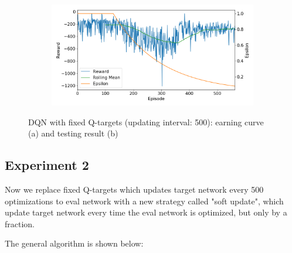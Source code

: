 \documentclass[10pt]{article}
\begin{document}
\begin{figure}[H]
\begin{subfigure}[b]{0.49\linewidth}
      \caption{}
  \label{fig:train_param_0082}
  \end{subfigure}
  \begin{subfigure}[b]{0.49\linewidth}
  \centering
  \includegraphics[width=\linewidth]{../logs/train_param_0083.png}
      \caption{}
  \label{fig:train_param_0083}
  \end{subfigure}
  \caption{DQN with fixed Q-targets (updating interval: 500): earning curve (a) and testing result (b)}
  \label{fig:param_0000}
\end{figure}


\subsection{Experiment 2} \label{experiment2}
Now we replace fixed Q-targets which updates target network every 500 optimizations to eval network with a new strategy called "soft update", which update target network every time the eval network is optimized, but only by a fraction.\par
\noindent
The general algorithm is shown below:\par
\end{document}
